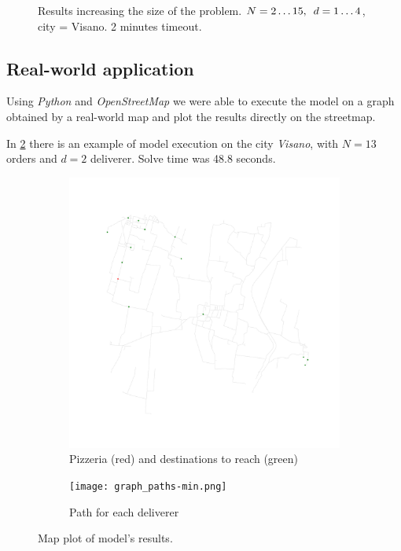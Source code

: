 \documentclass[10pt]{article}
\begin{document}
\begin{figure}
		\caption{Results increasing the size of the problem.
			$N = 2\dots15,\hspace{.5em} d=1\dots4$, city = Visano. 
			2 minutes timeout.}
        \label{fig:increasing-problem}
	\end{figure}

	\subsection{Real-world application}

	Using \textit{Python} and \textit{OpenStreetMap} we were able to execute the model
	on a graph obtained by a real-world map and plot the results directly on the streetmap.
	
	In \cref{fig:maps} there is an example of model execution on the city \textit{Visano}, 
	with $N = 13$ orders and $d = 2$ deliverer. Solve time was 48.8 seconds.

	\begin{figure}
		\begin{subfigure}[t]{.5\textwidth}
			\includegraphics[width=\textwidth]{graph.png}
			\caption{Pizzeria (red) and destinations to reach (green)}

		\end{subfigure}
		\begin{subfigure}[t]{.5\textwidth}
			\texttt{[image: graph\_paths-min.png]}
			\caption{Path for each deliverer}
		\end{subfigure}

		\caption{Map plot of model's results.}
        \label{fig:maps}
	\end{figure}
\end{document}
